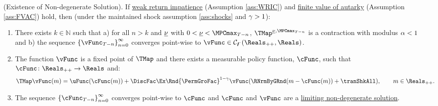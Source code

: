 \documentclass[\econtexRoot/BufferStockTheory]{subfiles}
\begin{document}
\hypertarget{Sufficient-Conditions-For-non-degenerate-Solution}{}
\begin{theorem}(Existence of Non-degenerate Solution).
\label{thm:convgtobellman}
If \hyperlink{WRIC}{weak return impatience} (Assumption \ref{ass:WRIC}) and \hyperlink{FVAC}{finite value of autarky} (Assumption \ref{ass:FVAC}) hold, then (under the maintained shock assumption \ref{ass:shocks} and $\gamma>1$):
%
\begin{enumerate}[label=(\roman*)]
\item There exists $k\in \mathbb{N}$ such that a) for all $n>k$ and $\underline{\nu}$ with $0<\MPCminInf<\MPCmax_{T-n}$, $\TMap^{\MPCminInf, \MPCmax_{T-n}}$ is a contraction with modulus $\alpha<1$ and b) the sequence $\left\{\vFunc_{T-n}\right\}_{n=0}^{\infty}$ converges point-wise to $\vFunc \in \mathcal{C}_{\boundFunc}(\Reals_{++},\Reals)$.
\item The function $\vFunc$ is a fixed point of $\TMap$ and there exists a measurable policy function, $\cFunc$, such that $\cFunc\colon \Reals_{++}\rightarrow \Reals$ and:
\begin{equation}\label{eq:stationarybellman}
\TMap\vFunc(m) =  \uFunc(\cFunc(m)) + \DiscFac\Ex \Rnd{\PermGroFac}^{1-\CRRA}\vFunc(\RNrmByGRnd(m-\cFunc(m)) + \tranShkAll) , \qquad m\in \Reals_{++}. 
\end{equation}
\item  The sequence $\left\{\cFunc_{T-n}\right\}_{n=0}^{\infty}$ converges point-wise to $\cFunc$ and $\cFunc$ and $\vFunc$ are a \hyperref[def:nondegeneracy]{limiting non-degenerate solution}.
\end{enumerate}
\end{theorem}
\end{document}
